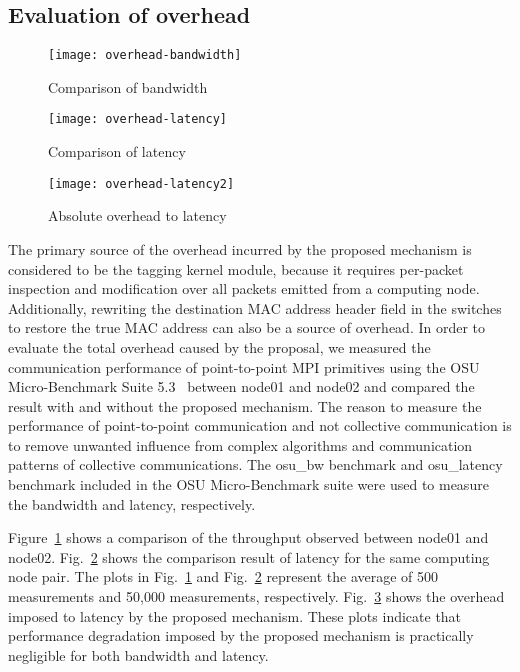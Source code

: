 \subsection{Evaluation of overhead}

\begin{figure}
    \centering
    \texttt{[image: overhead-bandwidth]}
    \caption{Comparison of bandwidth}%
    \label{fig:overhead-bandwidth}
\end{figure}

\begin{figure}
    \centering
    \texttt{[image: overhead-latency]}
    \caption{Comparison of latency}%
    \label{fig:overhead-latency}
\end{figure}

\begin{figure}
    \centering
    \texttt{[image: overhead-latency2]}
    \caption{Absolute overhead to latency}
    \label{fig:overhead-latency-2}
\end{figure}

The primary source of the overhead incurred by the proposed mechanism is
considered to be the tagging kernel module, because it requires
per-packet inspection and modification over all packets emitted from a
computing node. Additionally, rewriting the destination MAC address
header field in the switches to restore the true MAC address can also be
a source of overhead. In order to evaluate the total overhead caused by
the proposal, we measured the communication performance of
point-to-point MPI primitives using the OSU Micro-Benchmark Suite
5.3~\autocite{OhioStateUniversity2016} between node01 and node02 and
compared the result with and without the proposed mechanism. The reason
to measure the performance of point-to-point communication and not
collective communication is to remove unwanted influence from complex
algorithms and communication patterns of collective communications. The
osu\_bw benchmark and osu\_latency benchmark included in the OSU
Micro-Benchmark suite were used to measure the bandwidth and latency,
respectively.

Figure~\ref{fig:overhead-bandwidth} shows a comparison of the throughput
observed between node01 and node02. Fig.~\ref{fig:overhead-latency}
shows the comparison result of latency for the same computing node pair.
The plots in Fig.~\ref{fig:overhead-bandwidth} and
Fig.~\ref{fig:overhead-latency} represent the average of 500
measurements and 50,000 measurements, respectively.
Fig.~\ref{fig:overhead-latency-2} shows the overhead imposed to latency
by the proposed mechanism. These plots indicate that performance
degradation imposed by the proposed mechanism is practically negligible
for both bandwidth and latency.


